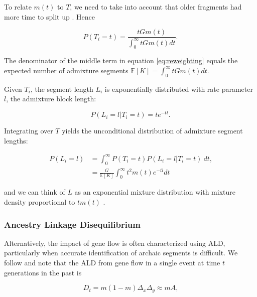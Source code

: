 \documentclass[11pt]{article}
\begin{document}
To relate $m(t)$ to $T$, we need to take into account that older fragments had more time to split up \citep[see e.g.][]{pool_inference_2009}. Hence

\begin{equation}
	P(T_i=t) = \frac{t  G m(t)}{\int_0^{\infty} t  G  m(t) dt}\label{eq:reweighting} \text{.}
\end{equation}

The denominator of the middle term in equation \ref{eq:reweighting} equals the expected number of admixture segments $\mathbb{E}[K] = \int_0^{\infty} t  G  m(t) dt$.

Given $T_i$, the segment length $L_i$ is exponentially distributed with rate parameter $l$, the admixture block length:

\begin{equation}
 \label{eq:generall_length_distribution}
    P(L_i=l|T_i=t) = t e^{-t l}  \text{.}
\end{equation}
	
	
Integrating over $T$ yields the unconditional distribution of admixture segment lengths:
	
\begin{align}
P(L_i=l) &= \int_{0}^{\infty} P(T_i=t) P(L_i=l | T_i=t) \ dt \text{,}\nonumber\\
&=\frac{G}{ \mathbb{E}[K]}\int_{0}^{\infty} t^2 m(t) e^{-tl}dt
    \label{eq:standard_likelihood_definintion}
\end{align}
	
	
and we can think of $L$ as an exponential mixture distribution with mixture density proportional to $tm(t)$ \citep{ralph_geography_2013, ni_length_2016, zhou_modeling_2017}.
	
\subsubsection{Ancestry Linkage Disequilibrium}
Alternatively, the impact of gene flow is often characterized using ALD, particularly when accurate identification of archaic segments is difficult. We follow \cite{loh_inferring_2013} and note that the ALD from gene flow in a single event at time $t$ generations in the past is

\begin{equation}
    D_{t} = m(1-m)\Delta_x \Delta_y \approx m A \text{,} \label{eq:ald_general}
\end{equation}
\end{document}
